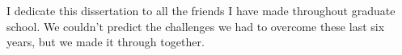 
I dedicate this dissertation to all the friends I have made throughout graduate school. We couldn't predict the challenges we had to overcome these last six years, but we made it through together.
